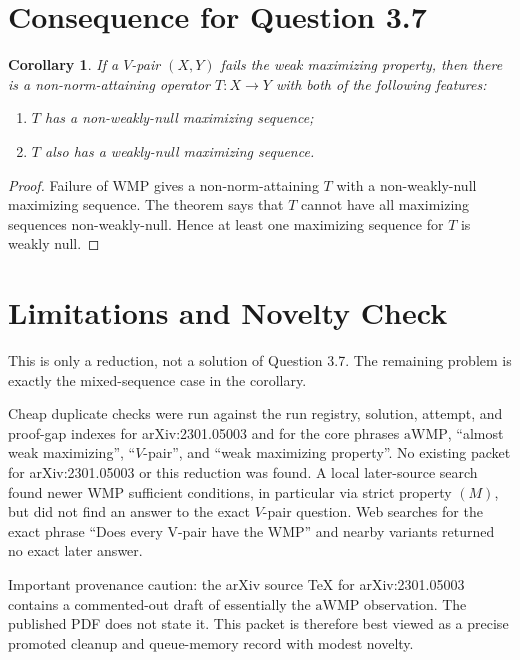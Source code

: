 \documentclass[11pt]{article}
\newtheorem{corollary}{Corollary}
\newcommand{\WMP}{\mathrm{WMP}}
\newcommand{\aWMP}{\mathrm{aWMP}}
\begin{document}
\section*{Consequence for Question 3.7}

\begin{corollary}
If a \(V\)-pair \((X,Y)\) fails the weak maximizing property, then there is a
non-norm-attaining operator \(T:X\to Y\) with both of the following features:
\begin{enumerate}[label=\textup{(\roman*)}]
\item \(T\) has a non-weakly-null maximizing sequence;
\item \(T\) also has a weakly-null maximizing sequence.
\end{enumerate}
\end{corollary}

\begin{proof}
Failure of \(\WMP\) gives a non-norm-attaining \(T\) with a non-weakly-null
maximizing sequence.  The theorem says that \(T\) cannot have all maximizing
sequences non-weakly-null.  Hence at least one maximizing sequence for \(T\)
is weakly null.
\end{proof}

\section*{Limitations and Novelty Check}

This is only a reduction, not a solution of Question 3.7.  The remaining
problem is exactly the mixed-sequence case in the corollary.

Cheap duplicate checks were run against the run registry, solution, attempt,
and proof-gap indexes for arXiv:2301.05003 and for the core phrases
\(\aWMP\), ``almost weak maximizing'', ``\(V\)-pair'', and ``weak maximizing
property''.  No existing packet for arXiv:2301.05003 or this reduction was
found.  A local later-source search found newer WMP sufficient conditions, in
particular via strict property \((M)\), but did not find an answer to the
exact \(V\)-pair question.  Web searches for the exact phrase ``Does every
V-pair have the WMP'' and nearby variants returned no exact later answer.

Important provenance caution: the arXiv source TeX for arXiv:2301.05003
contains a commented-out draft of essentially the \(\aWMP\) observation.  The
published PDF does not state it.  This packet is therefore best viewed as a
precise promoted cleanup and queue-memory record with modest novelty.
\end{document}
